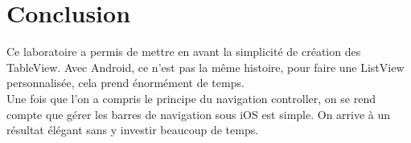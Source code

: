 \section{Conclusion}
Ce laboratoire a permis de mettre en avant la simplicité de création des TableView. Avec Android, ce n'est pas la même histoire, pour faire une ListView personnalisée, cela prend énormément de temps.\\
Une fois que l'on a compris le principe du navigation controller, on se rend compte que gérer les barres de navigation sous iOS est simple. On arrive à un résultat élégant sans y investir beaucoup de temps.